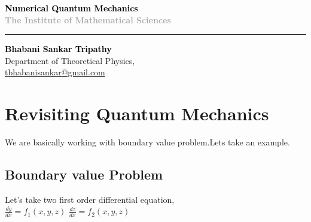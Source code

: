 \documentclass[a4paper,11pt]{report}
\makeatletter
\newcommand{\Title}{Numerical Quantum Mechanics}
\newcommand{\Subtitle}{The Institute of Mathematical Sciences}
\newcommand{\Author}{Bhabani Sankar Tripathy}
\newcommand{\Department}{Department of Theoretical Physics}
\newcommand{\Email}{tbhabanisankar@gmail.com}
\makeatother
\begin{document}
	
	\begin{flushleft}
		\vspace*{6.0cm} %
		\textcolor{black}{\textbf{\LARGE \Title}}\\
		\vspace{0.5cm}
		\textcolor{darkgray}{\textbf{\Subtitle}}\\
		\vspace{0.5cm}
		\rule{\textwidth}{1.4pt} %
	\end{flushleft}
	
	\vspace{0.5cm} %
	\begin{flushleft}
		\textcolor{black}{\large{\textbf{\Author}}}\\
		\textcolor{auburn}{\Department,}\\
		\vspace{0.5cm}
		\textcolor{auburn}{\href{mailto:\Email}{\Email}}
	\end{flushleft}
	\newpage
	
	\tableofcontents
	\newpage
	\chapter{Revisiting Quantum Mechanics}
	We are basically working with boundary value problem.Lets take an example.
	\section{Boundary value Problem}
	Let's take two first order differential equation,\\
	
	$\frac{dy}{dx}=f_1(x,y,z)$ \hspace{3cm} $\frac{dz}{dx}=f_2(x,y,z)$
    
	
\end{document}
